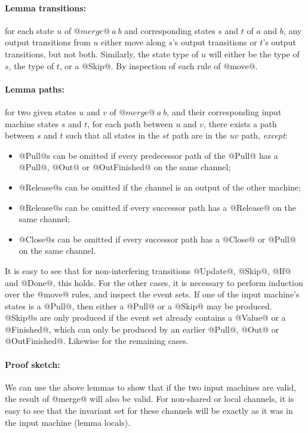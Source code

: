 \paragraph{Lemma transitions:} for each state $u$ of $@merge@~a~b$ and corresponding states $s$ and $t$ of $a$ and $b$, any output transitions from $u$ either move along $s$'s output transitions or $t$'s output transitions, but not both.
Similarly, the state type of $u$ will either be the type of $s$, the type of $t$, or a @Skip@.
By inspection of each rule of @move@.

\paragraph{Lemma paths:} for two given states $u$ and $v$ of $@merge@~a~b$, and their corresponding input machine states $s$ and $t$, for each path between $u$ and $v$, there exists a path between $s$ and $t$ such that all states in the $st$ path are in the $uv$ path, \emph{except}:
\begin{itemize}
\item @Pull@s can be omitted if every predecessor path of the @Pull@ has a @Pull@, @Out@ or @OutFinished@ on the same channel;
\item @Release@s can be omitted if the channel is an output of the other machine;
\item @Release@s can be omitted if every successor path has a @Release@ on the same channel;
\item @Close@s can be omitted if every successor path has a @Close@ or @Pull@ on the same channel.
\end{itemize}

It is easy to see that for non-interfering transitions @Update@, @Skip@, @If@ and @Done@, this holds.
For the other cases, it is necessary to perform induction over the @move@ rules, and inspect the event sets.
If one of the input machine's states is a @Pull@, then either a @Pull@ or a @Skip@ may be produced.
@Skip@s are only produced if the event set already contains a @Value@ or a @Finished@, which can only be produced by an earlier @Pull@, @Out@ or @OutFinished@.
Likewise for the remaining cases.


\paragraph{Proof sketch:} 
We can use the above lemmas to show that if the two input machines are valid, the result of @merge@ will also be valid.
For non-shared or local channels, it is easy to see that the invariant set for these channels will be exactly as it was in the input machine (lemma locals).

